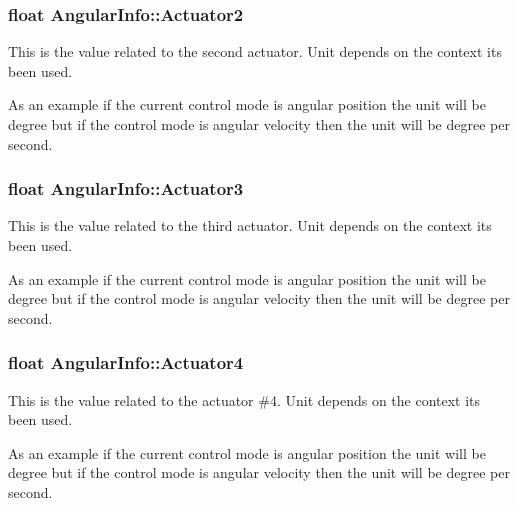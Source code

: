 \subsubsection[{\texorpdfstring{Actuator2}{Actuator2}}]{\setlength{\rightskip}{0pt plus 5cm}float Angular\+Info\+::\+Actuator2}\hypertarget{struct_angular_info_ab7b9349eef239f9741d9c28a795e4c35}{}\label{struct_angular_info_ab7b9349eef239f9741d9c28a795e4c35}


This is the value related to the second actuator. Unit depends on the context it\textquotesingle{}s been used. 

As an example if the current control mode is angular position the unit will be degree but if the control mode is angular velocity then the unit will be degree per second. 
\subsubsection[{\texorpdfstring{Actuator3}{Actuator3}}]{\setlength{\rightskip}{0pt plus 5cm}float Angular\+Info\+::\+Actuator3}\hypertarget{struct_angular_info_a30426eab94c82cfd3d697bbc8c506c2a}{}\label{struct_angular_info_a30426eab94c82cfd3d697bbc8c506c2a}


This is the value related to the third actuator. Unit depends on the context it\textquotesingle{}s been used. 

As an example if the current control mode is angular position the unit will be degree but if the control mode is angular velocity then the unit will be degree per second. 
\subsubsection[{\texorpdfstring{Actuator4}{Actuator4}}]{\setlength{\rightskip}{0pt plus 5cm}float Angular\+Info\+::\+Actuator4}\hypertarget{struct_angular_info_a46a1314c4846de6a495310b44fe5e0c3}{}\label{struct_angular_info_a46a1314c4846de6a495310b44fe5e0c3}


This is the value related to the actuator \#4. Unit depends on the context it\textquotesingle{}s been used. 

As an example if the current control mode is angular position the unit will be degree but if the control mode is angular velocity then the unit will be degree per second. 
